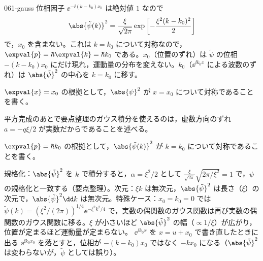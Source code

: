 \documentclass[uplatex,dvipdfmx,a4paper,11pt]{jsarticle}
\begin{document}
\begin{kaisetsu}{061-gauss}
 位相因子 $\ee^{-\ii(k-k_{0})x_{0}}$ は絶対値 $1$ なので
\[ \abs{\tilde{\psi}(k)}^{2}=\frac{\xi}{\sqrt{2\pi}}\exp\left[-\frac{\xi^{2}(k-k_{0})^{2}}{2}\right] \]
で，$x_{0}$ を含まない。これは $k=k_{0}$ について対称なので，$\expval{p}=\hbar\expval{k}=\hbar k_{0}$ である。$x_{0}$（位置のずれ）は $\tilde{\psi}$ の位相 $-(k-k_{0})x_{0}$ にだけ現れ，運動量の分布を変えない。$k_{0}$（$\ee^{\ii k_{0}x}$ による波数のずれ）は $\abs{\tilde{\psi}}^{2}$ の中心を $k=k_{0}$ に移す。
\begin{ronten}
  \item {} $\expval{x}=x_{0}$ の根拠として，$\abs{\psi}^{2}$ が $x=x_{0}$ について対称であることを書く。
  \item {} 平方完成のあとで要点整理のガウス積分を使えるのは，虚数方向のずれ $a=-q\xi/2$ が実数だからであることを述べる。
  \item {} $\expval{p}=\hbar k_{0}$ の根拠として，$\abs{\tilde{\psi}(k)}^{2}$ が $k=k_{0}$ について対称であることを書く。
\end{ronten}
\kenzan 規格化：$\abs{\tilde{\psi}}^{2}$ を $k$ で積分すると，$\alpha=\xi^{2}/2$ として $\frac{\xi}{\sqrt{2\pi}}\sqrt{2\pi/\xi^{2}}=1$ で，$\psi$ の規格化と一致する（要点整理）。次元：$\xi k$ は無次元，$\abs{\tilde{\psi}}^{2}$ は長さ（$\xi$）の次元で，$\abs{\tilde{\psi}}^{2}\dd k$ は無次元。特殊ケース：$x_{0}=k_{0}=0$ では $\tilde{\psi}(k)=(\xi^{2}/(2\pi))^{1/4}\ee^{-\xi^{2}k^{2}/4}$ で，実数の偶関数のガウス関数は再び実数の偶関数のガウス関数に移る。$\xi$ が小さいほど $\abs{\tilde{\psi}}^{2}$ の幅（$\propto1/\xi$）が広がり，位置が定まるほど運動量が定まらない。
\tsumazuki $\ee^{\ii k_{0}x}$ を $x=u+x_{0}$ で書き直したときに出る $\ee^{\ii k_{0}x_{0}}$ を落とすと，位相が $-(k-k_{0})x_{0}$ ではなく $-kx_{0}$ になる（$\abs{\tilde{\psi}}^{2}$ は変わらないが，$\tilde{\psi}$ としては誤り）。
\end{kaisetsu}
\end{document}
